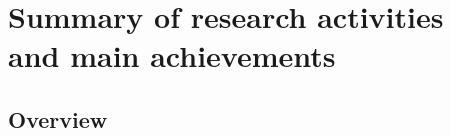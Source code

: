 \chapter{Summary of research activities \\and main achievements}
\label{research}

\vspace{-10mm}


\section{Overview} 
